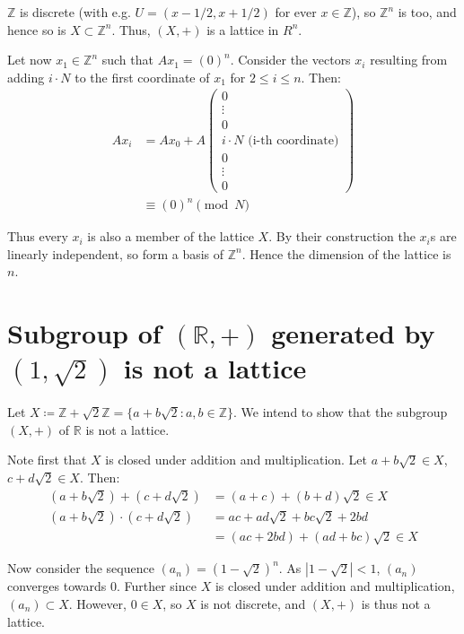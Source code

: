 \documentclass[a4paper]{scrreprt}
\begin{document}
$\mathbb{Z}$ is discrete (with e.g. $U = (x - 1/2, x + 1/2)$ for ever $x \in
\mathbb{Z}$), so $\mathbb{Z}^n$ is too, and hence so is $X \subset
\mathbb{Z}^n$. Thus, $(X, +)$ is a lattice in $R^n$.

Let now $x_1 \in \mathbb{Z}^n$ such that $Ax_1 = (0)^n$.  Consider the vectors
$x_i$ resulting from adding $i \cdot N$ to the first coordinate of $x_1$ for $2
\leq i \leq n$. Then:
\begin{align*}
		A x_i & = A x_0 + A \begin{pmatrix}
				0 \\
				\vdots \\
				0 \\
				i \cdot N \text{ (i-th coordinate)} \\
				0 \\
				\vdots \\
				0
		\end{pmatrix} \\
			  & \equiv (0)^n \pmod{N}
\end{align*}

Thus every $x_i$ is also a member of the lattice $X$. By their construction the
$x_i$s are linearly independent, so form a basis of $\mathbb{Z}^n$. Hence the
dimension of the lattice is $n$.

\section{Subgroup of $(\mathbb{R}, +)$ generated by $(1, \sqrt{2})$ is not a lattice}

Let $X \coloneqq \mathbb{Z} + \sqrt{2} \mathbb{Z} = \{a + b \sqrt{2} : a, b \in
\mathbb{Z}\}$. We intend to show that the subgroup $(X, +)$ of $\mathbb{R}$ is
not a lattice.

Note first that $X$ is closed under addition and multiplication. Let $a + b
\sqrt{2} \in X$, $c + d \sqrt{2} \in X$. Then:
\begin{align*}
		(a + b \sqrt{2}) + (c + d \sqrt{2}) & = (a + c) + (b + d) \sqrt{2} \in X \\
		(a + b \sqrt{2}) \cdot (c + d \sqrt{2}) & = ac + ad \sqrt{2} + bc \sqrt{2} + 2bd \\
												& = (ac + 2bd) + (ad + bc) \sqrt{2} \in X
\end{align*}

Now consider the sequence $(a_n) = \left(1 - \sqrt{2}\right)^n$. As $\left|1 -
\sqrt{2}\right| < 1$, $(a_n)$ converges towards $0$. Further since $X$ is
closed under addition and multiplication, $(a_n) \subset X$. However, $0 \in
X$, so $X$ is not discrete, and $(X, +)$ is thus not a lattice.
\end{document}
